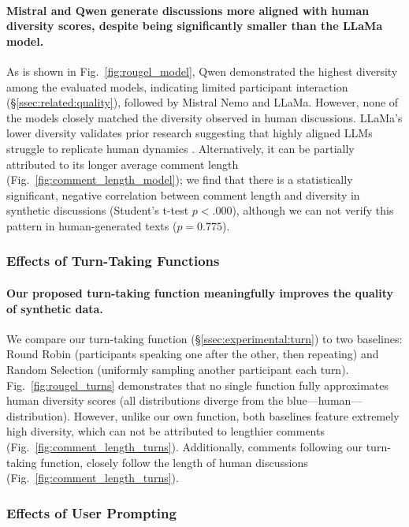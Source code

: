 \paragraph{Mistral and Qwen generate discussions more aligned with human diversity scores, despite being significantly smaller than the LLaMa model.} As is shown in Fig.~\ref{fig:rougel_model}, Qwen demonstrated the highest diversity among the evaluated models, indicating limited participant interaction (\S\ref{ssec:related:quality}), followed by Mistral Nemo and LLaMa. However, none of the models closely matched the diversity observed in human discussions. 
LLaMa's lower diversity validates prior research suggesting that highly aligned \acp{LLM} struggle to replicate human dynamics \cite{Park2023GenerativeAI, leng_2024}. Alternatively, it can be partially attributed to its longer average comment length (Fig.~\ref{fig:comment_length_model}); we find that there is a statistically significant, negative correlation between comment length and diversity in synthetic discussions (Student's t-test  $p < .000$), although we can not verify this pattern in human-generated texts ($p = 0.775$).


\subsubsection{Effects of Turn-Taking Functions}

\paragraph{Our proposed turn-taking function meaningfully improves the quality of synthetic data.} We compare our turn-taking function (\S\ref{ssec:experimental:turn}) to two baselines: Round Robin (participants speaking one after the other, then repeating) and Random Selection (uniformly sampling another participant each turn). Fig.~\ref{fig:rougel_turns} demonstrates that no single function fully approximates human diversity scores (all distributions diverge from the blue—human—distribution). However, unlike our own function, both baselines feature extremely high diversity, which can not be attributed to lengthier comments (Fig.~\ref{fig:comment_length_turns}). Additionally, comments following our turn-taking function, closely follow the length of human discussions (Fig.~\ref{fig:comment_length_turns}).


\subsubsection{Effects of User Prompting}

